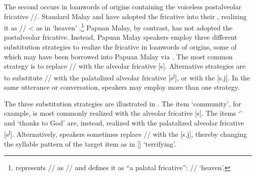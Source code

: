 The second  occurs in loanwords of  origins containing the voiceless postalveolar fricative //. Standard Malay and  have adopted the fricative into their , realizing it as // {\textless} as in  ‘heaven’ \citep[13]{Mintz.2002}.\footnote{\citet[13]{Mintz.2002} represents // as // and defines it as “a palatal fricative”:  // ‘heaven’.} Papuan Malay, by contrast, has not adopted the postalveolar fricative. Instead, Papuan Malay speakers employ three different substitution strategies to realize the fricative in loanwords of  origins, some of which may have been borrowed into Papuan Malay via . The most common strategy is to replace // with the alveolar fricative [s]. Alternative strategies are to substitute // with the palatalized alveolar fricative [s\textsuperscript{j}], or with the  [s.j]. In the same utterance or conversation, speakers may employ more than one strategy.



The three substitution strategies are illustrated in . The item  ‘community’, for example, is most commonly realized with the alveolar fricative [s]. The items  ‘’ and  ‘thanks to God’ are, instead, realized with the palatalized alveolar fricative [s\textsuperscript{j}]. Alternatively, speakers sometimes replace // with the  [s.j], thereby changing the syllable pattern of the target item as in  [] ‘terrifying’.

